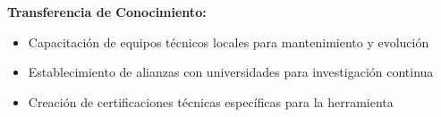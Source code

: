 \textbf{Transferencia de Conocimiento:}
\begin{itemize}
    \item Capacitación de equipos técnicos locales para mantenimiento y evolución
    \item Establecimiento de alianzas con universidades para investigación continua
    \item Creación de certificaciones técnicas específicas para la herramienta
\end{itemize}
